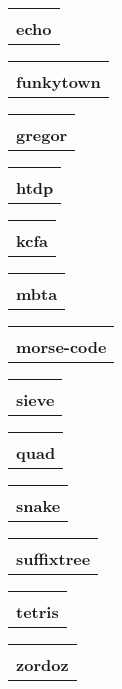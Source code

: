 \documentclass{article}
\newcommand{\pict}[1]{\begin{tabular}{c}\resizebox{!}{3cm}{}\\\textbf{#1}\end{tabular}}
\begin{document}

\pict{echo}
\hfill
\pict{funkytown}
\hfill
\pict{gregor}
\hfill
\pict{htdp}
\vfill
\pict{kcfa}
\hfill
\pict{mbta}
\hfill
\pict{morse-code}
\hfill
\pict{sieve}
\vfill
\pict{quad}
\hfill
\pict{snake}
\hfill
\pict{suffixtree}
\vfill
\hfill
\pict{tetris}
\hfill
\pict{zordoz}
\hfill{}
\end{document}
